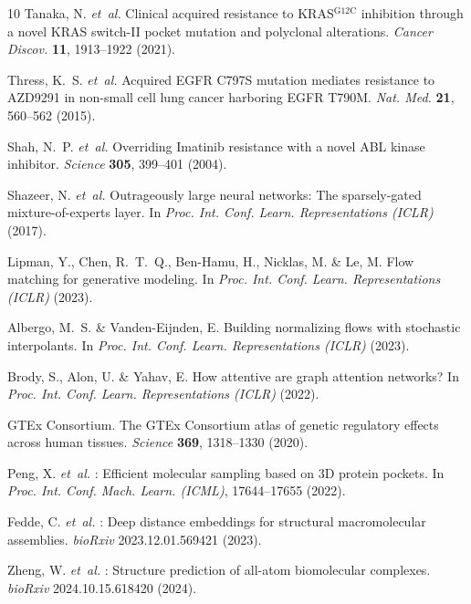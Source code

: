 \documentclass[11pt,a4paper]{article}
\begin{document}
\begin{thebibliography}{10}
Tanaka, N. \emph{et~al.}
\newblock Clinical acquired resistance to {KRAS}$^{\mathrm{G12C}}$ inhibition through a novel {KRAS} switch-{II} pocket mutation and polyclonal alterations.
\newblock \emph{Cancer Discov.} \textbf{11}, 1913--1922 (2021).

Thress, K.~S. \emph{et~al.}
\newblock Acquired {EGFR} {C797S} mutation mediates resistance to {AZD9291} in non-small cell lung cancer harboring {EGFR} {T790M}.
\newblock \emph{Nat. Med.} \textbf{21}, 560--562 (2015).

Shah, N.~P. \emph{et~al.}
\newblock Overriding {Imatinib} resistance with a novel {ABL} kinase inhibitor.
\newblock \emph{Science} \textbf{305}, 399--401 (2004).

Shazeer, N. \emph{et~al.}
\newblock Outrageously large neural networks: The sparsely-gated mixture-of-experts layer.
\newblock In \emph{Proc. Int. Conf. Learn. Representations (ICLR)} (2017).

Lipman, Y., Chen, R.~T.~Q., Ben-Hamu, H., Nicklas, M. \& Le, M.
\newblock Flow matching for generative modeling.
\newblock In \emph{Proc. Int. Conf. Learn. Representations (ICLR)} (2023).

Albergo, M.~S. \& Vanden-Eijnden, E.
\newblock Building normalizing flows with stochastic interpolants.
\newblock In \emph{Proc. Int. Conf. Learn. Representations (ICLR)} (2023).

Brody, S., Alon, U. \& Yahav, E.
\newblock How attentive are graph attention networks?
\newblock In \emph{Proc. Int. Conf. Learn. Representations (ICLR)} (2022).

{GTEx Consortium}.
\newblock The {GTEx} {Consortium} atlas of genetic regulatory effects across human tissues.
\newblock \emph{Science} \textbf{369}, 1318--1330 (2020).

Peng, X. \emph{et~al.}
: Efficient molecular sampling based on 3{D} protein pockets.
\newblock In \emph{Proc. Int. Conf. Mach. Learn. (ICML)}, 17644--17655 (2022).

Fedde, C. \emph{et~al.}
: Deep distance embeddings for structural macromolecular assemblies.
\newblock \emph{bioRxiv} 2023.12.01.569421 (2023).

Zheng, W. \emph{et~al.}
: Structure prediction of all-atom biomolecular complexes.
\newblock \emph{bioRxiv} 2024.10.15.618420 (2024).


\end{thebibliography}
\end{document}
